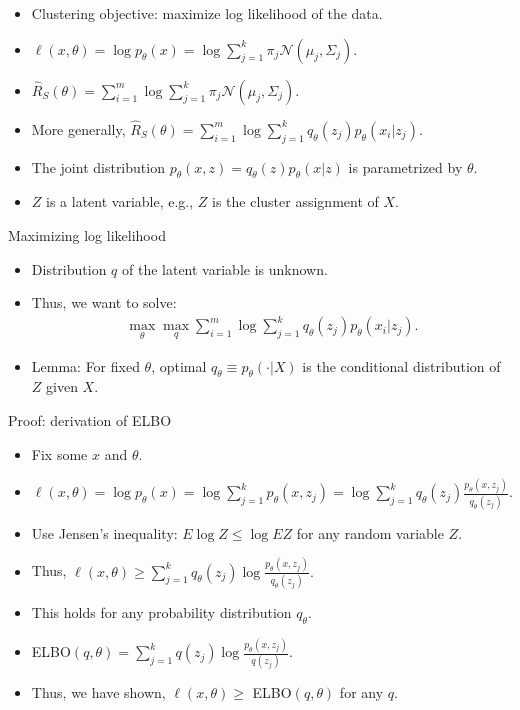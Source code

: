 \documentclass[final]{beamer}
\begin{document}
\begin{frame}
	\begin{itemize}
		\item Clustering objective: maximize log likelihood of the data.
		\pause
		\item $\ell(x, \theta) = \log p_\theta(x) = \log \sum_{j=1}^k \pi_j \mathcal{N}(\mu_j, \Sigma_j).$
		\pause
		\item $\hat{R}_S(\theta) = \sum_{i=1}^m \log \sum_{j=1}^k \pi_j \mathcal{N}(\mu_j, \Sigma_j).$
		\pause
	\item More generally, $\hat{R}_S(\theta) = \sum_{i=1}^m \log \sum_{j=1}^k q_\theta(z_j) p_\theta(x_i | z_j).$
	\pause
	\item The joint distribution $p_\theta(x, z) = q_\theta(z) p_\theta(x | z)$ is parametrized by $\theta.$
	\pause
	\item $Z$ is a latent variable, e.g., $Z$ is the cluster assignment of $X.$
	\end{itemize}
\end{frame}
\begin{frame}{Maximizing log likelihood}
	\begin{itemize}
		\item Distribution $q$ of the latent variable is unknown. 
		\pause
		\item Thus, we want to solve:
			\begin{align}
				\max_\theta \max_q \sum_{i=1}^m \log \sum_{j=1}^k q_\theta(z_j) p_\theta(x_i | z_j).
			\end{align}
		\item Lemma: For fixed $\theta$, optimal $q_\theta \equiv p_\theta(\cdot|X)$ is the conditional distribution of $Z$ given $X$.
	\end{itemize}
\end{frame}
\begin{frame}{Proof: derivation of ELBO}
\begin{itemize}
	\item Fix some $x$ and $\theta$.
	\pause
	\item $\ell(x,\theta) = \log p_\theta(x) = \log \sum_{j=1}^k p_\theta(x, z_j) = \log \sum_{j=1}^k q_\theta(z_j) \frac{p_\theta(x, z_j)}{q_\theta(z_j)}.$
	\pause
	\item Use Jensen's inequality: $E\log Z \leq \log E Z$ for any random variable $Z.$
	\pause 
\item Thus, $\ell(x, \theta) \geq \sum_{j=1}^k q_\theta(z_j) \log \frac{p_\theta(x, z_j)}{q_\theta(z_j)}.$ 
\pause
\item This holds for any probability distribution $q_\theta$. 
\pause
\item ELBO$(q, \theta) = \sum_{j=1}^k q(z_j) \log \frac{p_\theta(x, z_j)}{q(z_j)}.$
\pause
\item Thus, we have shown, $\ell(x, \theta) \geq$ ELBO$(q, \theta)$ for any $q$.
\end{itemize}
\end{frame}
\end{document}
